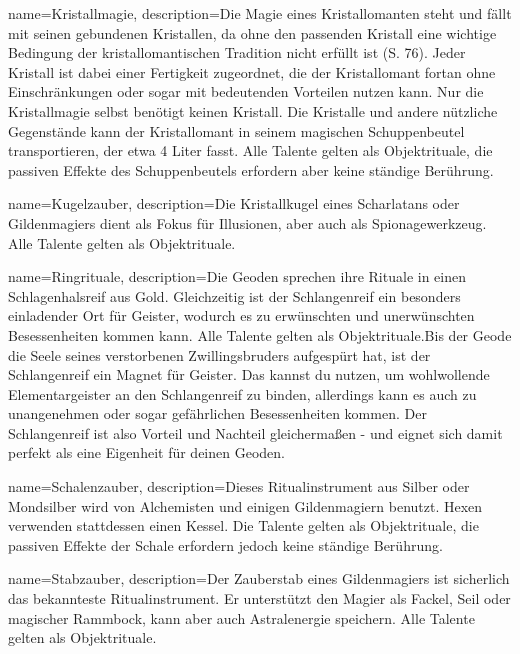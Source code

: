 {
    name={Kristallmagie},
    description={Die Magie eines Kristallomanten steht und fällt mit seinen gebundenen Kristallen, da ohne den passenden Kristall eine wichtige Bedingung der kristallomantischen Tradition nicht erfüllt ist (S. 76). Jeder Kristall ist dabei einer Fertigkeit zugeordnet, die der Kristallomant fortan ohne Einschränkungen oder sogar mit bedeutenden Vorteilen nutzen kann. Nur die Kristallmagie selbst benötigt keinen Kristall. Die Kristalle und andere nützliche Gegenstände kann der Kristallomant in seinem magischen Schuppenbeutel transportieren, der etwa 4 Liter fasst. Alle Talente gelten als Objektrituale, die passiven Effekte des Schuppenbeutels erfordern aber keine ständige Berührung.}
}


{
    name={Kugelzauber},
    description={Die Kristallkugel eines Scharlatans oder Gildenmagiers dient als Fokus für Illusionen, aber auch als Spionagewerkzeug. Alle Talente gelten als Objektrituale.}
}


{
    name={Ringrituale},
    description={Die Geoden sprechen ihre Rituale in einen Schlagenhalsreif aus Gold. Gleichzeitig ist der Schlangenreif ein besonders einladender Ort für Geister, wodurch es zu erwünschten und unerwünschten Besessenheiten kommen kann. Alle Talente gelten als Objektrituale.\newline   Bis der Geode die Seele seines verstorbenen Zwillingsbruders aufgespürt hat, ist der Schlangenreif ein Magnet für Geister. Das kannst du nutzen, um wohlwollende Elementargeister an den Schlangenreif zu binden, allerdings kann es auch zu unangenehmen oder sogar gefährlichen Besessenheiten kommen. Der Schlangenreif ist also Vorteil und Nachteil gleichermaßen - und eignet sich damit perfekt als eine Eigenheit für deinen Geoden.}
}


{
    name={Schalenzauber},
    description={Dieses Ritualinstrument aus Silber oder Mondsilber wird von Alchemisten und einigen Gildenmagiern benutzt. Hexen verwenden stattdessen einen Kessel. Die Talente gelten als Objektrituale, die passiven Effekte der Schale erfordern jedoch keine ständige Berührung.}
}


{
    name={Stabzauber},
    description={Der Zauberstab eines Gildenmagiers ist sicherlich das bekannteste Ritualinstrument. Er unterstützt den Magier als Fackel, Seil oder magischer Rammbock, kann aber auch Astralenergie speichern. Alle Talente gelten als Objektrituale. }
}


